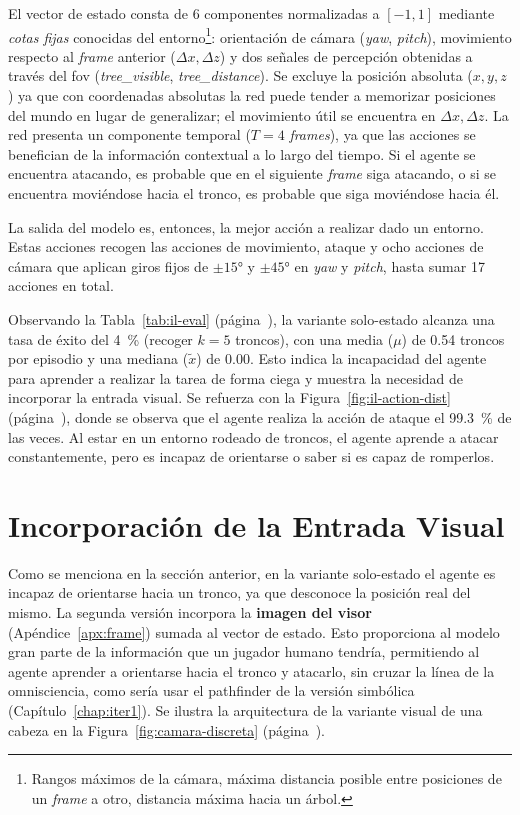 El vector de estado consta de \num{6} componentes normalizadas a $[-\num{1},\num{1}]$ mediante
\emph{cotas fijas} conocidas del entorno\footnote{Rangos máximos de la cámara, máxima distancia posible entre posiciones
de un \textit{frame} a otro, distancia máxima hacia un árbol.}: orientación de cámara
(\textit{yaw}, \textit{pitch}), movimiento respecto al \textit{frame} anterior
($\Delta x, \Delta z$) y dos señales de percepción obtenidas a través del \gls{fov}
(\textit{tree\_visible}, \textit{tree\_distance}). Se excluye la posición absoluta
($x, y, z$) ya que con coordenadas absolutas la red puede tender a memorizar posiciones
del mundo en lugar de generalizar; el movimiento útil se encuentra en $\Delta x, \Delta z$.
La red presenta un componente temporal ($T=\num{4}$ \textit{frames}), ya que las acciones se benefician 
de la información contextual a lo largo del tiempo.
Si el agente se encuentra atacando, es probable que en el siguiente \textit{frame} siga atacando,
o si se encuentra moviéndose hacia el tronco,
es probable que siga moviéndose hacia él.

La salida del modelo es, entonces, la mejor acción a realizar dado un entorno.
Estas acciones recogen las acciones de movimiento, ataque y ocho acciones de cámara que aplican giros fijos de $\pm\ang{15}$ y
$\pm\ang{45}$ en \textit{yaw} y \textit{pitch}, hasta sumar \num{17} acciones en total.

Observando la Tabla~\ref{tab:il-eval} (página~\pageref{tab:il-eval}), la variante solo-estado
alcanza una tasa de éxito del \qty{4}{\percent} (recoger $k=\num{5}$ troncos), con una media ($\mu$) de \num{0.54} troncos por episodio y
una mediana ($\tilde{x}$) de \num{0.00}. Esto indica la incapacidad del agente para aprender a realizar la tarea de forma
ciega y muestra la necesidad de incorporar la entrada visual. 
Se refuerza con la Figura~\ref{fig:il-action-dist} (página~\pageref{fig:il-action-dist}),
donde se observa que el agente realiza la acción de ataque el \qty{99.3}{\percent} de las veces. Al estar en un entorno
rodeado de troncos, el agente aprende a atacar constantemente, pero es incapaz de orientarse o
saber si es capaz de romperlos.

\section{Incorporación de la Entrada Visual}
Como se menciona en la sección anterior, en la variante solo-estado el agente es incapaz de orientarse hacia un tronco,
ya que desconoce la posición real del mismo.
La segunda versión incorpora la \textbf{imagen del visor} (Apéndice~\ref{apx:frame}) sumada al vector de estado.
Esto proporciona al modelo gran parte de la información que un jugador humano tendría,
permitiendo al agente aprender a orientarse hacia el tronco y atacarlo, sin cruzar la línea
de la omnisciencia, como sería usar el \gls{pathfinder} de la versión simbólica (Capítulo~\ref{chap:iter1}).
Se ilustra la arquitectura de la variante visual de una cabeza en la Figura~\ref{fig:camara-discreta} (página~\pageref{fig:camara-discreta}).


